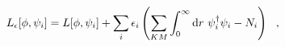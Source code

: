 \begin{equation}
L_{\epsilon}[\phi,\psi_i]=L[\phi,\psi_i]
	+\sum_i\epsilon_i \left(
		\sum_{KM}\int_{0}^{\infty}{\rm d}r~
			\psi_i^{\dagger}\psi_i -N_i\right)~~,
\label{Le.eqn2}
\end{equation}

